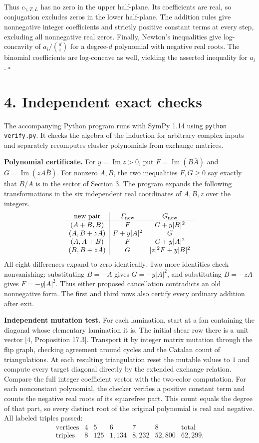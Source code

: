 \documentclass[11pt]{article}
\newcommand{\cc}{c_{\gamma,T,L}}
\newcommand{\im}{\operatorname{Im}}
\begin{document}
Thus \(\cc\) has no zero in the upper half-plane. Its coefficients are real, so conjugation excludes zeros in the lower half-plane. The addition rules give nonnegative integer coefficients and strictly positive constant terms at every step, excluding all nonnegative real zeros. Finally, Newton's inequalities give log-concavity of \(a_i/\binom{d}{i}\) for a degree-\(d\) polynomial with negative real roots. The binomial coefficients are log-concave as well, yielding the asserted inequality for \(a_i\). \hfill\(\square\)

\newpage
\section*{4. Independent exact checks}
The accompanying Python program runs with SymPy 1.14 using \texttt{python verify.py}. It checks the algebra of the induction for arbitrary complex inputs and separately recomputes cluster polynomials from exchange matrices.

\textbf{Polynomial certificate.}
For \(y=\im z>0\), put \(F=\im(B\overline A)\) and \(G=\im(zA\overline B)\). For nonzero \(A,B\), the two inequalities \(F,G\ge0\) say exactly that \(B/A\) is in the sector of Section 3. The program expands the following transformations in the six independent real coordinates of \(A,B,z\) over the integers.
\[
\begin{array}{c|cc}
  \text{new pair} & F_{\rm new} & G_{\rm new}\\ \hline
  (A+B,B)  & F & G+y|B|^2\\
  (A,B+zA) & F+y|A|^2 & G\\
  (A,A+B)  & F & G+y|A|^2\\
  (B,B+zA) & G & |z|^2 F+y|B|^2
\end{array}
\]
All eight differences expand to zero identically. Two more identities check nonvanishing: substituting \(B=-A\) gives \(G=-y|A|^2\), and substituting \(B=-zA\) gives \(F=-y|A|^2\). Thus either proposed cancellation contradicts an old nonnegative form. The first and third rows also certify every ordinary addition after exit.

\textbf{Independent mutation test.}
For each lamination, start at a fan containing the diagonal whose elementary lamination it is. The initial shear row there is a unit vector [4, Proposition 17.3]. Transport it by integer matrix mutation through the flip graph, checking agreement around cycles and the Catalan count of triangulations. At each resulting triangulation reset the mutable values to \(1\) and compute every target diagonal directly by the extended exchange relation. Compare the full integer coefficient vector with the two-color computation. For each nonconstant polynomial, the checker verifies a positive constant term and counts the negative real roots of its squarefree part. This count equals the degree of that part, so every distinct root of the original polynomial is real and negative. All labeled triples passed:
\[
\begin{array}{c|rrrrr|r}
\text{vertices} &4&5&6&7&8&\text{total}\\\hline
\text{triples} & 8&125&1{,}134&8{,}232&52{,}800&62{,}299 .
\end{array}
\]
\end{document}
